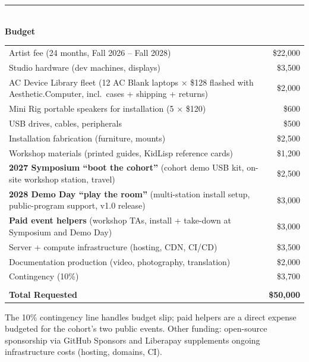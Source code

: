 \documentclass[12pt,letterpaper]{article}
\newcommand{\ac}{Aesthetic{\color{acpink}.}Computer}
\newcommand{\achead}[1]{%
  \vspace{1.6em}%
  {\color{acpink}\noindent\rule{\textwidth}{1.5pt}}\\[0.4em]
  {\large\bfseries #1}%
  \vspace{0.4em}%
}
\begin{document}
\achead{Budget}

\renewcommand{\arraystretch}{1.3}
\begin{tabularx}{\textwidth}{@{}Xr@{}}
  Artist fee (24 months, Fall 2026 -- Fall 2028) & \$22,000 \\
  Studio hardware (dev machines, displays) & \$3,500 \\
  AC Device Library fleet (12 AC Blank laptops × \$128 flashed with \ac{}, incl.\ cases + shipping + returns) & \$2,000 \\
  Mini Rig portable speakers for installation (5 × \$120) & \$600 \\
  USB drives, cables, peripherals & \$500 \\
  Installation fabrication (furniture, mounts) & \$2,500 \\
  Workshop materials (printed guides, KidLisp reference cards) & \$1,200 \\
  \textbf{2027 Symposium ``boot the cohort''} (cohort demo USB kit, on-site workshop station, travel) & \$2,500 \\
  \textbf{2028 Demo Day ``play the room''} (multi-station install setup, public-program support, v1.0 release) & \$3,000 \\
  \textbf{Paid event helpers} (workshop TAs, install + take-down at Symposium and Demo Day) & \$3,000 \\
  Server + compute infrastructure (hosting, CDN, CI/CD) & \$3,500 \\
  Documentation production (video, photography, translation) & \$2,000 \\
  Contingency (10\%) & \$3,700 \\
  {\color{acgray}\hrulefill} & {\color{acgray}\hrulefill} \\[-0.3em]
  \textbf{Total Requested} & \textbf{\$50,000} \\
\end{tabularx}
\renewcommand{\arraystretch}{1.0}

\vspace{0.2em}
{\color{acgray} The 10\% contingency line handles budget slip; paid helpers are a direct expense budgeted for the cohort's two public events. Other funding: open-source sponsorship via GitHub Sponsors and Liberapay supplements ongoing infrastructure costs (hosting, domains, CI).}

\end{document}
